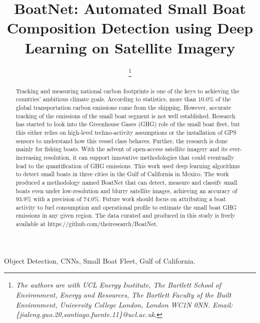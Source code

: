 \documentclass[lettersize,journal]{IEEEtran}
\begin{document}
\title{BoatNet: Automated Small Boat Composition Detection using Deep Learning on Satellite Imagery}

\author{

\thanks{\textit{
The authors are with UCL Energy Institute, The Bartlett School of Environment, Energy and Resources, The Bartlett Faculty of the Built Environment, University College London, London WC1N 0NN. Email: \{jialeng.guo.20,santiago.fuente.11\}@ucl.ac.uk}.} 
}



\maketitle

\begin{abstract}
Tracking and measuring national carbon footprints is one of the keys to achieving the countries' ambitious climate goals. According to statistics, more than 10.0\% of the global transportation carbon emissions come from the shipping. However, accurate tracking of the emissions of the small boat segment is not well established. Research has started to look into the Greenhouse Gases (GHG) role of the small boat fleet, but this either relies on high-level techno-activity assumptions or the installation of GPS sensors to understand how this vessel class behaves. Further, the research is done mainly for fishing boats. With the advent of open-access satellite imagery and its ever-increasing resolution, it can support innovative methodologies that could eventually lead to the quantification of GHG emissions. This work used deep learning algorithms to detect small boats in three cities in the Gulf of California in Mexico. The work produced a methodology named BoatNet that can detect, measure and classify small boats even under low-resolution and blurry satellite images, achieving an accuracy of 93.9\% with a precision of 74.0\%. Future work should focus on attributing a boat activity to fuel consumption and operational profile to estimate the small boat GHG emissions in any given region. The data curated and produced in this study is freely available at https://github.com/theiresearch/BoatNet.
\end{abstract}


\begin{IEEEkeywords}
Object Detection, CNNs, Small Boat Fleet, Gulf of California.
\end{IEEEkeywords}
\end{document}
